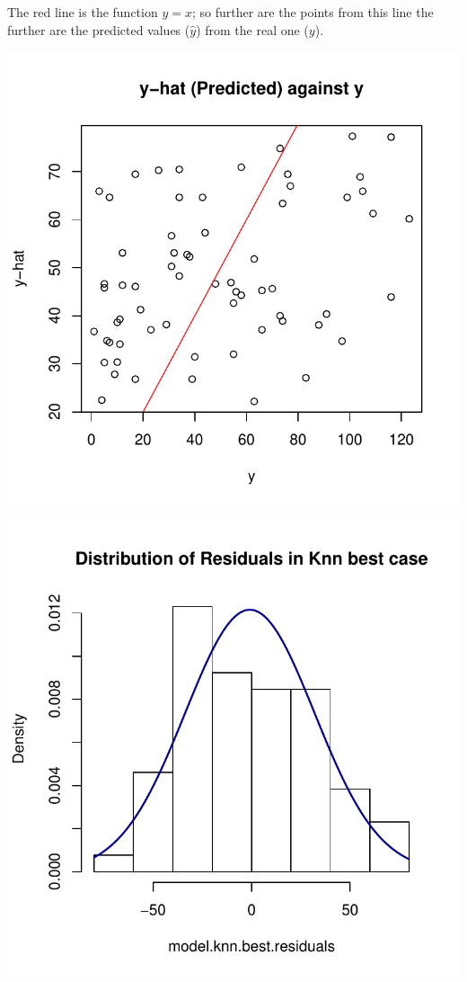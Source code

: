 \documentclass[]{report}
\begin{document}
The red line is the function $y=x$; so further are the points from this line the further are the predicted values ($\hat{y}$) from the real one ($y$).

\begin{center}
	\includegraphics[width=0.9\linewidth]{Figures/knn_predicted_test.pdf}
	\label{fig:knn_predicted_test}
\end{center}

\begin{center}
	\includegraphics[width=0.9\linewidth]{Figures/knn_predicted_test_residuals.pdf}
	\label{fig:knn_predicted_test_residuals}
\end{center}
\end{document}
